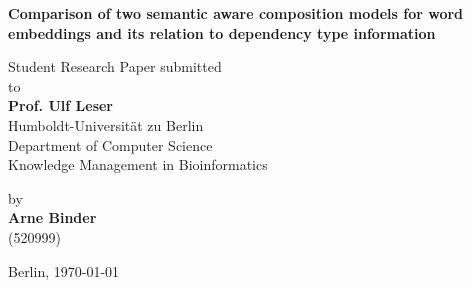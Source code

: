 \begin{center}

    {\Large{\bf Comparison of two semantic aware composition models for word embeddings and its relation to dependency type information}} \vspace{0.5cm}


    {\normalsize Student Research Paper submitted\\\vspace{0.5cm}
    to}\\\vspace{0.5cm}
    {\normalsize{\bf Prof. Ulf Leser}} \\\vspace{0.5cm}
    {\normalsize Humboldt-Universität zu Berlin \\
    Department of Computer Science \\
    Knowledge Management in Bioinformatics} \vspace{1cm}


    {\normalsize by \\\vspace{0.5cm}
    {\bf Arne Binder} \\
    (520999)} \vspace{1cm}


    {\normalsize Berlin, \today}

\end{center}
